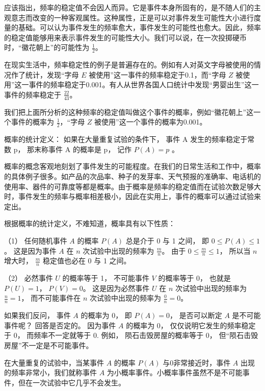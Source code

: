 应该指出，频率的稳定值不会因人而异。它是事件本身所固有的，是不随人们的主观意志而改变的一种客观属性。这种属性，正是可以对事件发生可能性大小进行度量的基础。可以认为事件发生的频率愈大，事件发生的可能性也愈大。因此，频率的稳定值能够用来表示事件发生的可能性大小。我们可以说，在一次投掷硬币时，``徽花朝上''的可能性为
\(\frac{1}{2}\)。

在现实生活中，频率稳定性的例子是普遍存在的。例如有人对英文字母被使用的情况作了统计，发现``字母
\(E\) 被使用''这一事件的频率稳定于0.1，而``字母 \(Z\)
被使用''这一事件的频率稳定于0.001。有人从世界各国人口统计中发现``男婴出生''这一事件的频率稳定于
\(\frac{22}{43}\)。

我们把上面所分析的这种频率的稳定值叫做这个事件的概率，例如``徽花朝上''这一个事件的概率为
\(\frac{1}{2}\)，``字母 \(Z\) 被使用''这一个事件的概率为0.001。

概率的统计定义： 如果在大量重复试验的条件下， 事件 A
发生的频率稳定于常数 p， 那末称事件 A 的概率是 p， 记作 \(P(A) = p\) 。

概率的概念客观地刻划了事件发生的可能程度。在我们的日常生活和工作中，概率的具体例子很多。如产品的次品率、种子的发芽率、天气预报的准确率、电话机的使用率、器件的可靠度等都是概率。由于概率是频率的稳定值而在试验次数足够大时，事件发生的频率与概率相差极小，因此在实用上，事件的概率可以通过试验来定出。

根据概率的统计定义，不难知道，概率具有以下性质：

（1） 任何随机事件 \(A\) 的概率 \(P(A)\) 总是介于 0 与 1 之间， 即
\(0 \leqslant P(A) \leqslant 1\)。 这是因为事件 \(A\) 在 \(n\)
次试验中出现的频率为 \(\frac{m}{n}\)。 由于
\(0 \leqslant \frac{m}{n} \leqslant 1\)， 所以当 \(n\) 增大时，
\(\frac{m}{n}\) 稳定值也必在 0 与 1 之间。

（2） 必然事件 \(U\) 的概率等于 1， 不可能事件 \(V\) 的概率等于 0，
也就是 \(P(U) = 1\)， \(P(V) = 0\)。 这是因为必然事件 \(U\) 在 \(n\)
次试验中出现的频率为 \(\frac{n}{n} = 1\)， 而不可能事件在 \(n\)
次试验中出现的频率为 \(\frac{0}{n} = 0\)。

如果我们反问， 事件 \(A\) 的概率为 0， 即 \(P(A) = 0\)， 是否可以断定
\(A\) 是不可能事件呢？ 回答是否定的。 因为事件 \(A\) 的概率为 0，
仅仅说明它发生的频率稳定于 0， 而频率不一定就等于 0. 例如，
陨石击毁房屋的概率等于 0， 但``陨石击毁房屋''不一定是不可能事件。

在大量重复的试验中，当某事件 \(A\) 的概率 \(P(A)\) 与0非常接近时，事件
\(A\) 出现的频率非常小，我们就称事件 \(A\)
为小概率事件。小概率事件虽然不是不可能事件，但在一次试验中它几乎不会发生。

